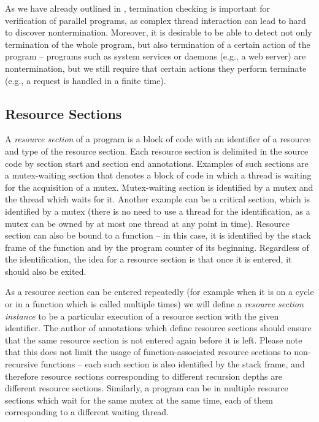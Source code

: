 As we have already outlined in , termination checking is important for verification of parallel programs, as complex thread interaction can lead to hard to discover nontermination.
Moreover, it is desirable to be able to detect not only termination of the whole program, but also termination of a certain action of the program -- programs such as system services or daemons (e.g., a web server) are nontermination, but we still require that certain actions they perform terminate (e.g., a request is handled in a finite time).

\subsection{Resource Sections}

A \emph{resource section} of a program is a block of code with an identifier of a resource and type of the resource section.
Each resource section is delimited in the source code by section start and section end annotations.
Examples of such sections are a mutex-waiting section that denotes a block of code in which a thread is waiting for the acquisition of a mutex.
Mutex-waiting section is identified by a mutex and the thread which waits for it.
Another example can be a critical section, which is identified by a mutex (there is no need to use a thread for the identification, as a mutex can be owned by at most one thread at any point in time).
Resource section can also be bound to a function -- in this case, it is identified by the stack frame of the function and by the program counter of its beginning.
Regardless of the identification, the idea for a resource section is that once it is entered, it should also be exited.

As a resource section can be entered repeatedly (for example when it is on a cycle or in a function which is called multiple times) we will define a \emph{resource section instance} to be a particular execution of a resource section with the given identifier.
The author of annotations which define resource sections should ensure that the same resource section is not entered again before it is left.
Please note that this does not limit the usage of function-associated resource sections to non-recursive functions -- each such section is also identified by the stack frame, and therefore resource sections corresponding to different recursion depths are different resource sections.
Similarly, a program can be in multiple resource sections which wait for the same mutex at the same time, each of them corresponding to a different waiting thread.

